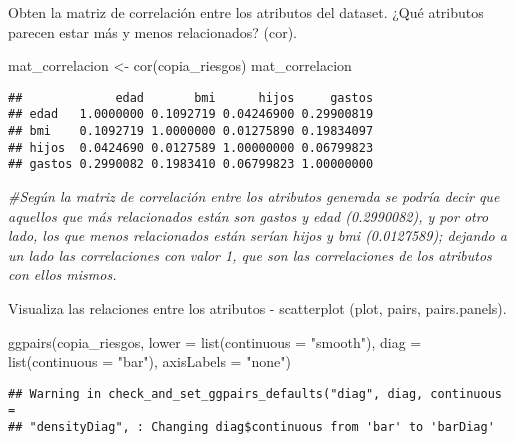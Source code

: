 \documentclass[
]{book}
\newenvironment{Shaded}{\begin{snugshade}}{\end{snugshade}}
\newcommand{\AttributeTok}[1]{\textcolor[rgb]{0.77,0.63,0.00}{#1}}
\newcommand{\CommentTok}[1]{\textcolor[rgb]{0.56,0.35,0.01}{\textit{#1}}}
\newcommand{\FunctionTok}[1]{\textcolor[rgb]{0.00,0.00,0.00}{#1}}
\newcommand{\NormalTok}[1]{#1}
\newcommand{\OtherTok}[1]{\textcolor[rgb]{0.56,0.35,0.01}{#1}}
\newcommand{\StringTok}[1]{\textcolor[rgb]{0.31,0.60,0.02}{#1}}
\begin{document}
Obten la matriz de correlación entre los atributos del dataset. ¿Qué atributos parecen estar más y menos relacionados? (cor).

\begin{Shaded}
\begin{Highlighting}[]
\NormalTok{mat\_correlacion }\OtherTok{\textless{}{-}} \FunctionTok{cor}\NormalTok{(copia\_riesgos)}
\NormalTok{mat\_correlacion}
\end{Highlighting}
\end{Shaded}

\begin{verbatim}
##             edad       bmi      hijos     gastos
## edad   1.0000000 0.1092719 0.04246900 0.29900819
## bmi    0.1092719 1.0000000 0.01275890 0.19834097
## hijos  0.0424690 0.0127589 1.00000000 0.06799823
## gastos 0.2990082 0.1983410 0.06799823 1.00000000
\end{verbatim}

\begin{Shaded}
\begin{Highlighting}[]
\CommentTok{\#Según la matriz de correlación entre los atributos generada se podría decir que aquellos que más relacionados están son gastos y edad (0.2990082), y por otro lado, los que menos relacionados están serían hijos y bmi (0.0127589); dejando a un lado las correlaciones con valor 1, que son las correlaciones de los atributos con ellos mismos.}
\end{Highlighting}
\end{Shaded}

Visualiza las relaciones entre los atributos - scatterplot (plot, pairs, pairs.panels).

\begin{Shaded}
\begin{Highlighting}[]
\FunctionTok{ggpairs}\NormalTok{(copia\_riesgos, }\AttributeTok{lower =} \FunctionTok{list}\NormalTok{(}\AttributeTok{continuous =} \StringTok{"smooth"}\NormalTok{), }\AttributeTok{diag =} \FunctionTok{list}\NormalTok{(}\AttributeTok{continuous =} \StringTok{"bar"}\NormalTok{), }\AttributeTok{axisLabels =} \StringTok{"none"}\NormalTok{)}
\end{Highlighting}
\end{Shaded}

\begin{verbatim}
## Warning in check_and_set_ggpairs_defaults("diag", diag, continuous =
## "densityDiag", : Changing diag$continuous from 'bar' to 'barDiag'
\end{verbatim}
\end{document}
